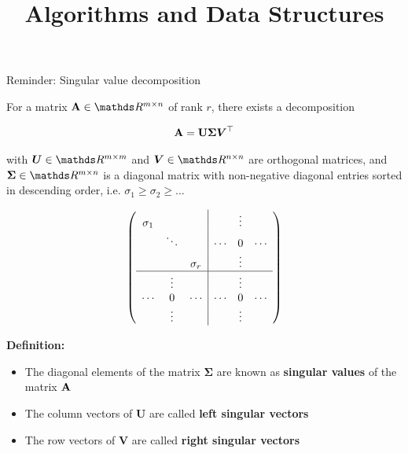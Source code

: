 \documentclass[11pt,compress,t,notes=noshow, xcolor=table]{beamer}
\title{Algorithms and Data Structures}
\begin{document}

\begin{vbframe}{Reminder: Singular value decomposition}

For a matrix $\Amat\in \R^{m \times n}$ of rank $r$, there exists a decomposition 

\vspace*{-0.4cm}
\begin{eqnarray*}
\mathbf{A} = \mathbf{U} \boldsymbol{\Sigma} \boldsymbol{V}^\top
\end{eqnarray*}

with $\bm{U} \in \R^{m \times m}$ and $\bm{V} \in \R^{n \times n}$ are orthogonal matrices, and $\boldsymbol{\Sigma}\in \R^{m \times n}$ is a diagonal matrix with non-negative diagonal entries sorted in descending order, i.e. $\sigma_1 \ge \sigma_2 \ge ... $

\begin{footnotesize}
$$
\left(\begin{array}{ccc|ccc}
\sigma_1 & & & & \vdots & \\
  & \ddots   &   & \cdots & 0      & \cdots \\
  &   & \sigma_r & & \vdots & \\
\hline
  &  \vdots  &   & & \vdots & \\
\cdots   &  0       & \cdots   & \cdots & 0      & \cdots \\
  &  \vdots  &   & & \vdots & \\

\end{array}\right)
$$
\end{footnotesize}

\framebreak 


\textbf{Definition:}
\begin{itemize}
\item The diagonal elements of the matrix $\boldsymbol{\Sigma}$ are known as \textbf{singular values} of the matrix $\mathbf{A}$
\item The column vectors of $\mathbf{U}$ are called \textbf{left singular vectors}
\item The row vectors of $\mathbf{V}$ are called \textbf{right singular vectors}
\end{itemize}


\end{vbframe}
\end{document}
